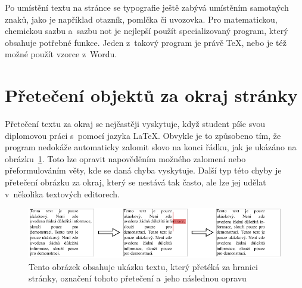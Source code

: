 Po umístění textu na stránce se typografie ještě zabývá umístěním samotných
znaků, jako je například otazník, pomlčka či uvozovka. Pro matematickou, 
chemickou sazbu a~sazbu not je nejlepší použít specializovaný program, 
který obsahuje potřebné funkce. Jeden z~takový program je právě \TeX,
nebo je též možné použít vzorce z~Wordu. 



\section{Přetečení objektů za okraj stránky}
Přetečení textu za okraj se nejčastěji vyskytuje, když student píše svou diplomovou
práci s~pomocí jazyka {\LaTeX}. Obvykle je to způsobeno tím, že program nedokáže
automaticky zalomit slovo na konci řádku, jak je ukázáno na
obrázku~\ref{pic_overflow}. Toto lze opravit napověděním možného
zalomení nebo přeformulováním věty, kde se daná chyba vyskytuje.
Další typ této chyby je přetečení obrázku za okraj,
který se nestává tak často, ale lze jej udělat v~několika textových editorech.

\begin{figure}[H]
    \centering
    \includegraphics[width=\linewidth]{obrazky-figures/overflow_example.pdf}
    \caption{
        Tento obrázek obsahuje ukázku textu, který přetéká za hranici stránky,
        označení tohoto přetečení a~jeho následnou opravu
    }
    \label{pic_overflow}
\end{figure}


